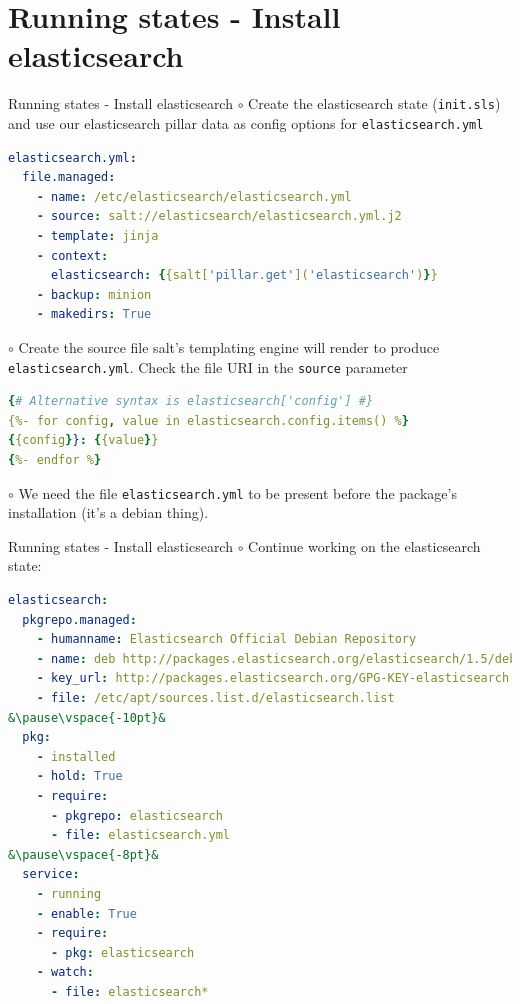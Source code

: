 \documentclass[dvipsnames]{beamer}
\begin{document}
\section{Running states - Install elasticsearch}
\begin{frame}[fragile]{Running states - Install elasticsearch}
\small
$\circ$ Create the elasticsearch state (\texttt{init.sls}) and use our elasticsearch 
pillar data as config options for \texttt{elasticsearch.yml}
\begin{lstlisting}[language=yaml]
elasticsearch.yml:
  file.managed:
    - name: /etc/elasticsearch/elasticsearch.yml
    - source: salt://elasticsearch/elasticsearch.yml.j2
    - template: jinja
    - context:
      elasticsearch: {{salt['pillar.get']('elasticsearch')}}
    - backup: minion
    - makedirs: True
\end{lstlisting}
\pause
$\circ$ Create the source file salt's templating engine will render to produce 
\texttt{elasticsearch.yml}. Check the file URI in the \texttt{source} parameter
\pause
\begin{lstlisting}[language=yaml]
{# Alternative syntax is elasticsearch['config'] #}
{%- for config, value in elasticsearch.config.items() %}
{{config}}: {{value}}
{%- endfor %}
\end{lstlisting}
\pause
$\circ$ We need the file \texttt{elasticsearch.yml} to be present before the package's installation (it's a debian thing).
\end{frame}
\begin{frame}[fragile]{Running states - Install elasticsearch}
$\circ$ Continue working on the elasticsearch state:
\begin{lstlisting}[language=yaml]
elasticsearch:
  pkgrepo.managed:
    - humanname: Elasticsearch Official Debian Repository
    - name: deb http://packages.elasticsearch.org/elasticsearch/1.5/debian stable main
    - key_url: http://packages.elasticsearch.org/GPG-KEY-elasticsearch
    - file: /etc/apt/sources.list.d/elasticsearch.list 
&\pause\vspace{-10pt}&
  pkg:
    - installed
    - hold: True
    - require:
      - pkgrepo: elasticsearch
      - file: elasticsearch.yml
&\pause\vspace{-8pt}&
  service:
    - running
    - enable: True
    - require:
      - pkg: elasticsearch
    - watch:
      - file: elasticsearch*
\end{lstlisting}
\end{frame}
\normalsize
\end{document}
